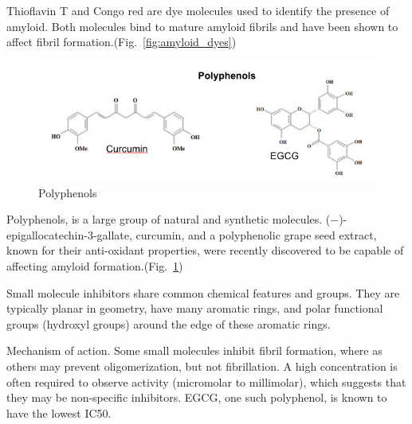 \begin{outline}[enumerate]
        \3 Thioflavin T and Congo red are dye molecules used to identify the presence of amyloid.  Both molecules bind to mature amyloid fibrils and have been shown to affect fibril formation.(Fig.~\ref{fig:amyloid_dyes})

        \begin{figure}
          \centering
          \includegraphics[width=6in]{figures/introduction/polyphenols.png}
          \caption[Small molecule binders]{Polyphenols}
          \label{fig:polyphenols}
        \end{figure}
        
        \3 Polyphenols,  is a large group of natural and synthetic molecules.  (−)-epigallocatechin-3-gallate, curcumin, and a polyphenolic grape seed extract, known for their anti-oxidant properties,  were recently discovered to be capable of affecting amyloid formation.(Fig.~\ref{fig:polyphenols})
      
      \2 Small molecule inhibitors share common chemical features and groups.  They are typically planar in geometry, have many aromatic rings, and polar functional groups (hydroxyl groups) around the edge of these aromatic rings.
    
    	\2 Mechanism of action. Some small molecules inhibit fibril formation, where as others may prevent oligomerization, but not fibrillation. A high concentration is often required to observe activity (micromolar to millimolar), which suggests that they may be non-specific inhibitors. EGCG, one such polyphenol, is known to have the lowest IC50.
      

\end{outline}
